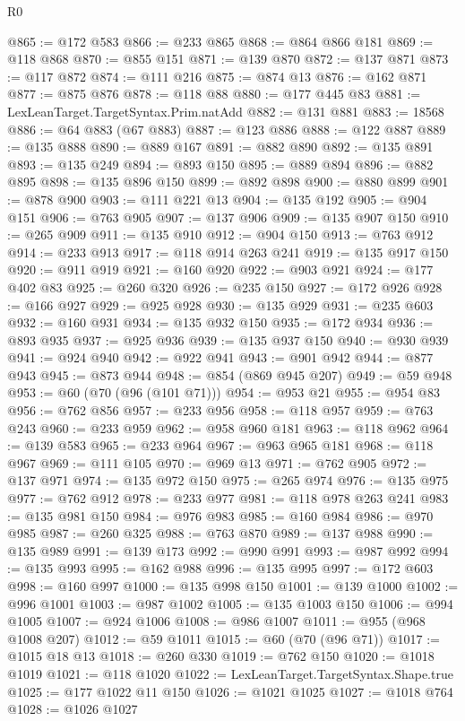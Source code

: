 \begin{lexlean}{R0}
\begin{coremodule}
@865 := @172 @583
@866 := @233 @865
@868 := @864 @866 @181
@869 := @118 @868
@870 := @855 @151
@871 := @139 @870
@872 := @137 @871
@873 := @117 @872
@874 := @111 @216
@875 := @874 @13
@876 := @162 @871
@877 := @875 @876
@878 := @118 @88
@880 := @177 @445 @83
@881 := LexLeanTarget.TargetSyntax.Prim.natAdd
@882 := @131 @881
@883 := 18568
@886 := @64 @883 (@67 @883)
@887 := @123 @886
@888 := @122 @887
@889 := @135 @888
@890 := @889 @167
@891 := @882 @890
@892 := @135 @891
@893 := @135 @249
@894 := @893 @150
@895 := @889 @894
@896 := @882 @895
@898 := @135 @896 @150
@899 := @892 @898
@900 := @880 @899
@901 := @878 @900
@903 := @111 @221 @13
@904 := @135 @192
@905 := @904 @151
@906 := @763 @905
@907 := @137 @906
@909 := @135 @907 @150
@910 := @265 @909
@911 := @135 @910
@912 := @904 @150
@913 := @763 @912
@914 := @233 @913
@917 := @118 @914 @263 @241
@919 := @135 @917 @150
@920 := @911 @919
@921 := @160 @920
@922 := @903 @921
@924 := @177 @402 @83
@925 := @260 @320
@926 := @235 @150
@927 := @172 @926
@928 := @166 @927
@929 := @925 @928
@930 := @135 @929
@931 := @235 @603
@932 := @160 @931
@934 := @135 @932 @150
@935 := @172 @934
@936 := @893 @935
@937 := @925 @936
@939 := @135 @937 @150
@940 := @930 @939
@941 := @924 @940
@942 := @922 @941
@943 := @901 @942
@944 := @877 @943
@945 := @873 @944
@948 := @854 (@869 @945 @207)
@949 := @59 @948
@953 := @60 (@70 (@96 (@101 @71)))
@954 := @953 @21
@955 := @954 @83
@956 := @762 @856
@957 := @233 @956
@958 := @118 @957
@959 := @763 @243
@960 := @233 @959
@962 := @958 @960 @181
@963 := @118 @962
@964 := @139 @583
@965 := @233 @964
@967 := @963 @965 @181
@968 := @118 @967
@969 := @111 @105
@970 := @969 @13
@971 := @762 @905
@972 := @137 @971
@974 := @135 @972 @150
@975 := @265 @974
@976 := @135 @975
@977 := @762 @912
@978 := @233 @977
@981 := @118 @978 @263 @241
@983 := @135 @981 @150
@984 := @976 @983
@985 := @160 @984
@986 := @970 @985
@987 := @260 @325
@988 := @763 @870
@989 := @137 @988
@990 := @135 @989
@991 := @139 @173
@992 := @990 @991
@993 := @987 @992
@994 := @135 @993
@995 := @162 @988
@996 := @135 @995
@997 := @172 @603
@998 := @160 @997
@1000 := @135 @998 @150
@1001 := @139 @1000
@1002 := @996 @1001
@1003 := @987 @1002
@1005 := @135 @1003 @150
@1006 := @994 @1005
@1007 := @924 @1006
@1008 := @986 @1007
@1011 := @955 (@968 @1008 @207)
@1012 := @59 @1011
@1015 := @60 (@70 (@96 @71))
@1017 := @1015 @18 @13
@1018 := @260 @330
@1019 := @762 @150
@1020 := @1018 @1019
@1021 := @118 @1020
@1022 := LexLeanTarget.TargetSyntax.Shape.true
@1025 := @177 @1022 @11 @150
@1026 := @1021 @1025
@1027 := @1018 @764
@1028 := @1026 @1027

\end{coremodule}
\end{lexlean}
